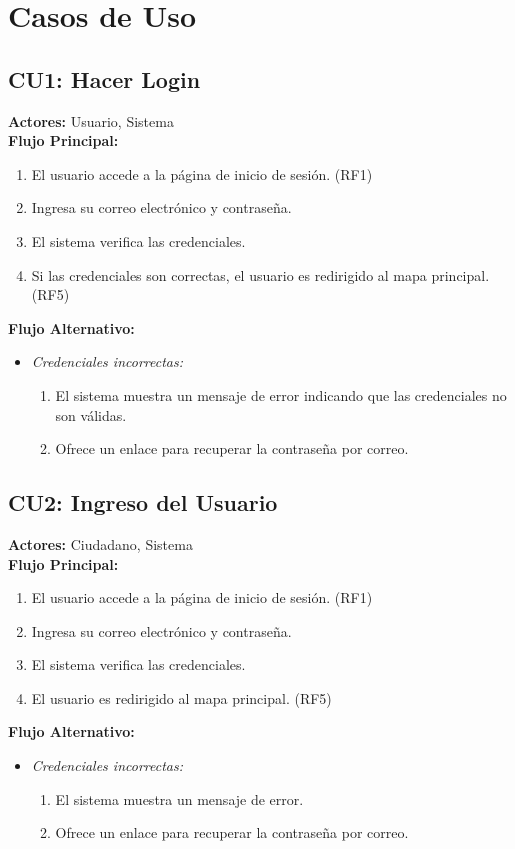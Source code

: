 \section{Casos de Uso}

\subsection*{CU1: Hacer Login}
\textbf{Actores:} Usuario, Sistema\\
\textbf{Flujo Principal:}
\begin{enumerate}
    \item El usuario accede a la página de inicio de sesión. (RF1)
    \item Ingresa su correo electrónico y contraseña.
    \item El sistema verifica las credenciales.
    \item Si las credenciales son correctas, el usuario es redirigido al mapa principal. (RF5)
\end{enumerate}
\textbf{Flujo Alternativo:}
\begin{itemize}
    \item \textit{Credenciales incorrectas:}
    \begin{enumerate}
        \item El sistema muestra un mensaje de error indicando que las credenciales no son válidas.
        \item Ofrece un enlace para recuperar la contraseña por correo.
    \end{enumerate}
\end{itemize}

\subsection*{CU2: Ingreso del Usuario}
\textbf{Actores:} Ciudadano, Sistema\\
\textbf{Flujo Principal:}
\begin{enumerate}
    \item El usuario accede a la página de inicio de sesión. (RF1)
    \item Ingresa su correo electrónico y contraseña.
    \item El sistema verifica las credenciales.
    \item El usuario es redirigido al mapa principal. (RF5)
\end{enumerate}
\textbf{Flujo Alternativo:}
\begin{itemize}
    \item \textit{Credenciales incorrectas:}
    \begin{enumerate}
        \item El sistema muestra un mensaje de error.
        \item Ofrece un enlace para recuperar la contraseña por correo.
    \end{enumerate}
\end{itemize}

